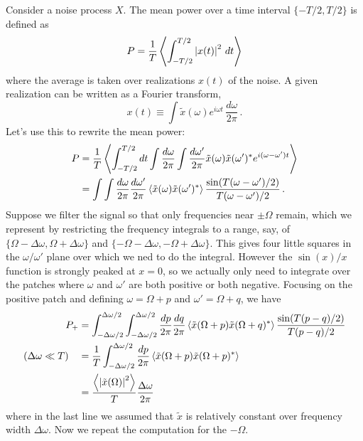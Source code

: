 
Consider a noise process $X$.
The mean power over a time interval $\{-T/2,T/2\}$ is defined as
\begin{equation}
P = \frac{1}{T} \left \langle \int_{-T/2}^{T/2} \left \lvert x(t) \right \rvert^2 \, dt \right \rangle
\end{equation}
where the average is taken over realizations $x(t)$ of the noise.
A given realization can be written as a Fourier transform,
\begin{equation}
x(t) \equiv
\int \tilde{x}(\omega) e^{i \omega t} \, \frac{d \omega}{2\pi} \, .
\end{equation}
Let's use this to rewrite the mean power:
\begin{align}
P
&= \frac{1}{T}\left \langle 
\int_{-T/2}^{T/2} dt
\int \frac{d\omega}{2\pi}
\int \frac{d\omega'}{2\pi}
\tilde{x}(\omega) \tilde{x}(\omega')^*
e^{i(\omega - \omega')t} \right \rangle \nonumber \\
&= \int \int \frac{d\omega}{2\pi} \frac{d\omega'}{2\pi}
\left \langle \tilde{x}(\omega)\tilde{x}(\omega')^* \right \rangle
\frac{\sin(T(\omega - \omega')/2)}{T (\omega - \omega')/2} \, .
\end{align}
Suppose we filter the signal so that only frequencies near $\pm \Omega$ remain, which we represent by restricting the frequency integrals to a range, say, of $\{\Omega-\Delta \omega, \Omega+\Delta \omega\}$ and $\{-\Omega - \Delta \omega, -\Omega + \Delta \omega\}$.
This gives four little squares in the $\omega/\omega'$ plane over which we ned to do the integral.
However the $\sin(x)/x$ function is strongly peaked at $x=0$, so we actually only need to integrate over the patches where $\omega$ and $\omega'$ are both positive or both negative.
Focusing on the positive patch and defining $\omega = \Omega + p$ and $\omega' = \Omega + q$, we have
\begin{align}
P_+ &=
  \int_{-\Delta \omega/2}^{\Delta\omega/2}
  \int_{-\Delta \omega/2}^{\Delta\omega/2}
  \frac{dp}{2\pi} \frac{dq}{2\pi}
  \left \langle \tilde{x}(\Omega+p)\tilde{x}(\Omega+q)^* \right \rangle \frac{\sin(T(p-q)/2)}{T(p-q)/2} \nonumber \\
  (\Delta \omega \ll T) \quad &=
  \frac{1}{T} \int_{-\Delta \omega/2}^{\Delta \omega / 2}
  \frac{dp}{2\pi} \left \langle \tilde{x}(\Omega + p) \tilde{x}(\Omega + p)^* \right \rangle \nonumber \\
  &= \frac{\left \langle \left \lvert \tilde{x}(\Omega) \right \rvert^2 \right \rangle}{T} \frac{\Delta \omega}{2 \pi}
\end{align}
where in the last line we assumed that $\tilde{x}$ is relatively constant over frequency width $\Delta \omega$.
Now we repeat the computation for the $-\Omega$.
